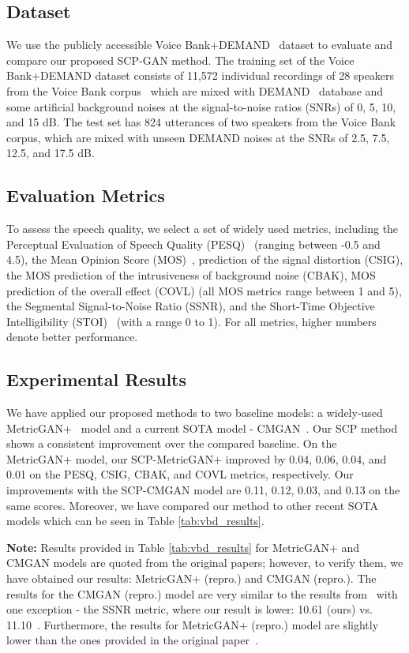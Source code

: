 \documentclass{article}
\begin{document}
\subsection{Dataset}
We use the publicly accessible Voice Bank+DEMAND~\cite{ValentiniBotinhao2016InvestigatingRS} dataset to evaluate and compare our proposed SCP-GAN method. The training set of the Voice Bank+DEMAND dataset consists of 11,572 individual recordings of 28 speakers from the Voice Bank corpus~\cite{6709856} which are mixed with DEMAND~\cite{doi:10.1121/1.4799597} database and some artificial background noises at the signal-to-noise ratios (SNRs) of 0, 5, 10, and 15 dB. The test set has 824 utterances of two speakers from the Voice Bank corpus, which are mixed with unseen DEMAND noises at the SNRs of 2.5, 7.5, 12.5, and 17.5 dB.

\subsection{Evaluation Metrics}
To assess the speech quality, we select a set of widely used metrics, including the Perceptual Evaluation of Speech Quality (PESQ)~\cite{Rix2001PerceptualEO} (ranging between -0.5 and 4.5), the Mean Opinion Score (MOS)~\cite{4389058}, prediction of the signal distortion (CSIG), the MOS prediction of the intrusiveness of background noise (CBAK), MOS prediction of the overall effect (COVL) (all MOS metrics range between 1 and 5), the Segmental Signal-to-Noise Ratio (SSNR), and the Short-Time Objective Intelligibility (STOI)~\cite{5495701} (with a range 0 to 1). For all metrics, higher numbers denote better performance.

\subsection{Experimental Results}
We have applied our proposed methods to two baseline models: a widely-used MetricGAN+~\cite{fu2021metricgan+} model and a current SOTA model - CMGAN~\cite{cao2022cmgan}. Our SCP method shows a consistent improvement over the compared baseline. On the MetricGAN+ model, our SCP-MetricGAN+ improved by 0.04, 0.06, 0.04, and 0.01 on the PESQ, CSIG, CBAK, and COVL metrics, respectively. Our improvements with the SCP-CMGAN model are 0.11, 0.12, 0.03, and 0.13 on the same scores. Moreover, we have compared our method to other recent SOTA models which can be seen in Table \ref{tab:vbd_results}.


\textbf{Note:} Results provided in Table \ref{tab:vbd_results} for MetricGAN+ and CMGAN models are quoted from the original papers; however, to verify them, we have obtained our results: MetricGAN+ (repro.) and CMGAN (repro.). The results for the CMGAN (repro.) model are very similar to the results from~\cite{cao2022cmgan} with one exception - the SSNR metric, where our result is lower: 10.61 (ours) vs. 11.10~\cite{cao2022cmgan}. Furthermore, the results for MetricGAN+ (repro.) model are slightly lower than the ones provided in the original paper~\cite{fu2021metricgan+}.
\end{document}
